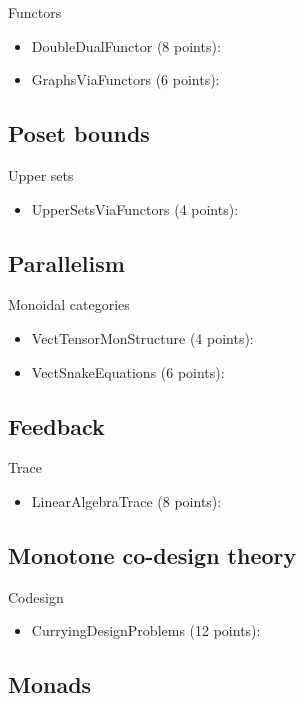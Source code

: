 Functors
\begin{itemize}
    \item DoubleDualFunctor (8 points): 
    \item GraphsViaFunctors (6 points): 
\end{itemize}

\subsection{Poset bounds}
Upper sets
\begin{itemize}
    \item UpperSetsViaFunctors (4 points): 
\end{itemize}

\subsection{Parallelism}

Monoidal categories
\begin{itemize}
    \item VectTensorMonStructure (4 points): 
    \item VectSnakeEquations (6 points): 
\end{itemize}

\subsection{Feedback}

Trace
\begin{itemize}
    \item LinearAlgebraTrace (8 points): 
\end{itemize}

\subsection{Monotone co-design theory}

Codesign
\begin{itemize}
    \item CurryingDesignProblems (12 points): 
\end{itemize}

\subsection{Monads}

